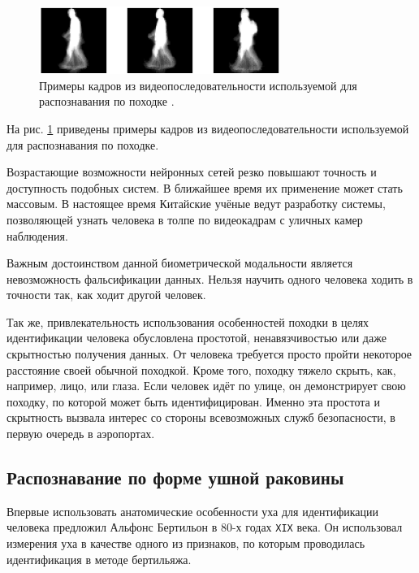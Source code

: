 \documentclass[14pt, a4paper]{extarticle}
\begin{document}
\begin{center}
	\begin{figure}[h!]
		\centering
		\includegraphics[width=0.7\textwidth]{gate.png}
		\caption{Примеры кадров из видеопоследовательности используемой для распознавания по походке \cite{veres2005fusion}.}
		\label{img:gate}
	\end{figure}
\end{center}
\vspace{-1cm}

На рис. \ref{img:gate} приведены примеры кадров из видеопоследовательности используемой для распознавания по походке. 

Возрастающие возможности нейронных сетей резко повышают точность и доступность подобных систем. В ближайшее время их применение может стать массовым.
В настоящее время Китайские учёные ведут разработку системы, позволяющей узнать человека в толпе по видеокадрам с уличных камер наблюдения. 

Важным достоинством данной биометрической модальности является невозможность фальсификации данных. Нельзя научить одного человека ходить в точности так, как ходит другой человек.

Так же, привлекательность использования особенностей походки в целях идентификации человека обусловлена простотой, ненавязчивостью или даже скрытностью получения данных. От человека требуется просто пройти некоторое расстояние своей обычной походкой. Кроме того, походку тяжело скрыть, как, например, лицо, или глаза. Если человек идёт по улице, он демонстрирует свою походку, по которой может быть идентифицирован. Именно эта простота и скрытность вызвала интерес со стороны всевозможных служб безопасности, в первую очередь в аэропортах.
\subsection{Распознавание по форме ушной раковины}
Впервые использовать анатомические особенности уха для идентификации человека предложил Альфонс Бертильон в 80-х годах \texttt{XIX} века. Он использовал измерения уха в качестве одного из признаков, по которым проводилась идентификация в методе бертильяжа.

\end{document}
